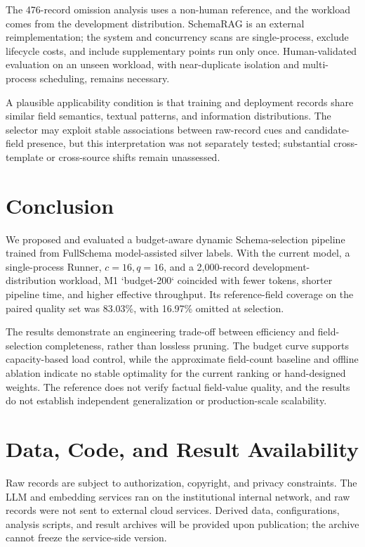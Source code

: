 \documentclass[runningheads]{llncs}
\newcommand{\method}{M1}
\newcommand{\full}{FullSchema}
\newcommand{\schemarag}{SchemaRAG}
\begin{document}
 The 476-record omission analysis uses a non-human reference, and the workload comes from the development distribution. \schemarag{} is an external reimplementation; the system and concurrency scans are single-process, exclude lifecycle costs, and include supplementary points run only once. Human-validated evaluation on an unseen workload, with near-duplicate isolation and multi-process scheduling, remains necessary.

 A plausible applicability condition is that training and deployment records share similar field semantics, textual patterns, and information distributions. The selector may exploit stable associations between raw-record cues and candidate-field presence, but this interpretation was not separately tested; substantial cross-template or cross-source shifts remain unassessed.

\section{Conclusion}

\begin{sloppypar}
\setlength{\emergencystretch}{4em}
We proposed and evaluated a budget-aware dynamic Schema-selection pipeline trained from \full{} model-assisted silver labels. With the current model, a single-process Runner, $c=16,q=16$, and a 2,000-record development-distribution workload, \method{} `budget-200` coincided with fewer tokens, shorter pipeline time, and higher effective throughput. Its reference-field coverage on the paired quality set was 83.03\%, with 16.97\% omitted at selection.
\end{sloppypar}

The results demonstrate an engineering trade-off between efficiency and field-selection completeness, rather than lossless pruning. The budget curve supports capacity-based load control, while the approximate field-count baseline and offline ablation indicate no stable optimality for the current ranking or hand-designed weights. The reference does not verify factual field-value quality, and the results do not establish independent generalization or production-scale scalability.

\section*{Data, Code, and Result Availability}

Raw records are subject to authorization, copyright, and privacy constraints. The LLM and embedding services ran on the institutional internal network, and raw records were not sent to external cloud services. Derived data, configurations, analysis scripts, and result archives will be provided upon publication; the archive cannot freeze the service-side version.



\end{document}
